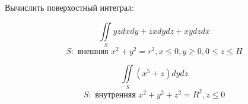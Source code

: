 \documentclass[russian]{article}
\begin{document}
Вычислить поверхостный интеграл:

$$\iint\limits_S yzdxdy + zxdydz + xydzdx$$
$$S: \text{ внешняя } x^2 + y^2 = r^2, x \le 0, y \ge 0, 0 \le z \le H$$

$$\iint\limits_S (x^5 + z) dydz$$
$$S: \text{ внутренняя } x^2 + y^2 + z^2 = R^2, z \le 0$$
 
\end{document}
